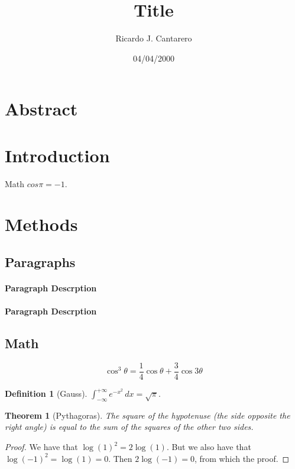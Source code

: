 \documentclass{article}
\title{Title}
\date{04/04/2000}
\author{Ricardo J. Cantarero}
\theoremstyle{definition}
\newtheorem{definition}{Definition}
\theoremstyle{plain}
\newtheorem{theorem}{Theorem}
\theoremstyle{remark}
\begin{document}
\maketitle

\tableofcontents

\listoffigures

\listoftables

\section*{Abstract}

\newpage


\section{Introduction}

\lipsum[1-3]
Math $cos\pi=-1$.

\section{Methods}

\lipsum[5]

\subsection{Paragraphs}
\lipsum[6]
\paragraph{Paragraph Descrption} \lipsum[7]

\paragraph{Paragraph Descrption} \lipsum[8]

\subsection{Math}
\lipsum[4]

\begin{equation}
\cos^{3}\theta = \frac{1}{4}\cos\theta+\frac{3}{4}\cos 3\theta
\label{eq:refname2}
\end{equation}

\lipsum[5]

\begin{definition}[Gauss]
$\int_{-\infty}^{+\infty}
e^{-x^2}\,dx=\sqrt{\pi}$.
\end{definition}
\begin{theorem}[Pythagoras]
The square of the hypotenuse (the side opposite the right angle) is equal to the sum of the squares of the other two sides.
\end{theorem}
\begin{proof}
We have that $\log(1)^2 = 2\log(1)$.
But we also have that $\log(-1)^2=\log(1)=0$.
Then $2\log(-1)=0$, from which the proof.
\end{proof}
\end{document}
